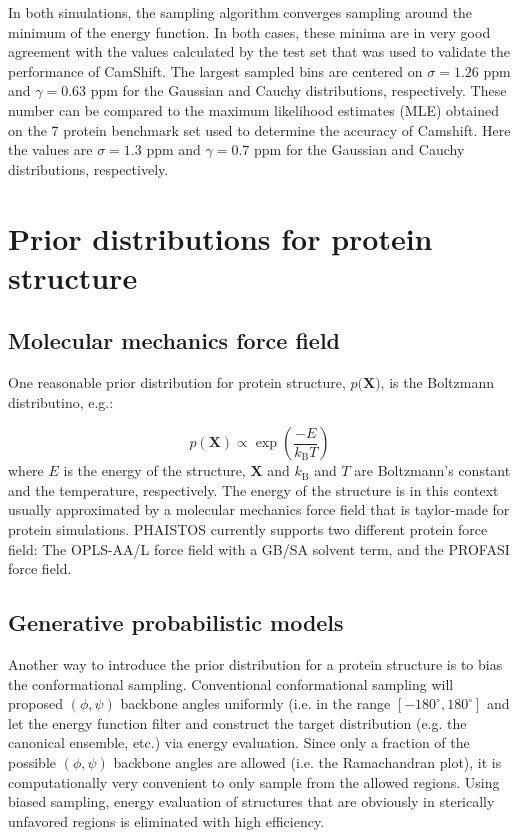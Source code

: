 In both simulations, the sampling algorithm converges sampling around the minimum of the energy function.
In both cases, these minima are in very good agreement with the values calculated by the test set that was used to validate the performance of CamShift.
The largest sampled bins are centered on $\sigma = 1.26$ ppm and $\gamma = 0.63$ ppm for the Gaussian and Cauchy distributions, respectively.
These number can be compared to the maximum likelihood estimates (MLE) obtained on the 7 protein benchmark set used to determine the accuracy of Camshift.
Here the values are $\sigma = 1.3$ ppm and $\gamma = 0.7$ ppm for the Gaussian and Cauchy distributions, respectively.


\section{Prior distributions for protein structure}


\subsection{Molecular mechanics force field}

One reasonable prior distribution for protein structure, $p(\mathbf{X)}$, is the Boltzmann distributino, e.g.:

\begin{equation}
    p(\mathbf{X}) \propto \exp\left( \frac{-E}{k_\mathrm{B}T}\right)
\end{equation}
where $E$ is the energy of the structure, $\mathbf{X}$ and $k_\mathrm{B}$ and $T$ are Boltzmann's constant and the temperature, respectively.
The energy of the structure is in this context usually approximated by a molecular mechanics force field that is taylor-made for protein simulations. PHAISTOS currently supports two different protein force field: The OPLS-AA/L force field with a GB/SA solvent term, and the PROFASI force field.

\subsection{Generative probabilistic models}

Another way to introduce the prior distribution for a protein structure is to bias the conformational sampling. 
Conventional conformational sampling will proposed $(\phi, \psi)$ backbone angles uniformly (i.e. in the range $[-180^{\circ}, 180^{\circ}]$ and let the energy function filter and construct the target distribution (e.g. the canonical ensemble, etc.) via energy evaluation.
Since only a fraction of the possible $(\phi, \psi)$ backbone angles are allowed (i.e. the Ramachandran plot), it is computationally very convenient to only sample from the allowed regions.
Using biased sampling, energy evaluation of structures that are obviously in sterically unfavored regions is eliminated with high efficiency.

